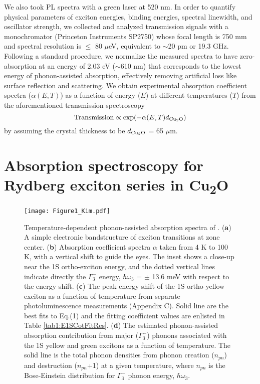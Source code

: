 \documentclass[aps,reprint,amsmath,amssymb,prb]{revtex4-1}
\begin{document}
We also took PL spectra with a green laser at 520 nm.  
In order to quantify physical parameters of exciton energies, binding energies, spectral linewidth, and oscillator strength, we collected and analyzed transmission signals with a monochromator (Princeton Instruments SP2750) whose focal length is 750 mm and spectral resolution is $\leq$ 80 $\mu$eV, equivalent to $\sim$20 pm or 19.3 GHz. 
Following a standard procedure, we normalize the measured spectra to have zero-absorption at an energy of 2.03 eV ($\sim$610 nm) that corresponds to the lowest energy of phonon-assisted absorption, effectively removing artificial loss like surface reflection and scattering. We obtain experimental absorption coefficient spectra ($\alpha (E, T)$) as a function of energy ($E$) at different temperatures ($T$) from the aforementioned transmission spectroscopy 
$$ \text{Transmission} \propto \exp(-\alpha (E,T) d_{\ce{Cu2O}})$$ 
by assuming the crystal thickness to be $d_{\ce{Cu2O}}$ = 65 $\mu$m. 

\section{Absorption spectroscopy for Rydberg exciton series in C\MakeLowercase{u}\textsubscript{2}O}

\begin{figure} 
\centering
\texttt{[image: Figure1\_Kim.pdf]}
\caption{Temperature-dependent phonon-assisted absorption spectra of . (\textbf{a}) A simple electronic bandstructure of  exciton transitions at zone center. (\textbf{b}) Absorption coefficient spectra $\alpha$ taken from 4 K to 100 K, with a vertical shift to guide the eyes. The inset shows a close-up near the 1S ortho-exciton energy, and the dotted vertical lines indicate directly the $\Gamma_3^-$ energy, $\hbar\omega_3$ = $\pm$ 13.6 meV with respect to the energy shift. (\textbf{c}) The peak energy shift of the 1S-ortho yellow exciton as a function of temperature from separate photoluminescence measurements (Appendix C). Solid line are the best fits to Eq.(1) and the fitting coefficient values are enlisted in Table \ref{tab1:E1SCotFitRes}. (\textbf{d}) The estimated phonon-assisted absorption contribution from major ($\Gamma_{3}^{-}$) phonons associated with the 1S yellow and green excitons as a function of temperature. The solid line is the total phonon densities from phonon creation ($n_{pn}$) and destruction ($n_{pn}$+1) at a given temperature, where $n_{pn}$ is the Bose-Einstein distribution for $\Gamma_{3}^{-}$ phonon energy, $\hbar \omega_3$. 
}
\label{Fig1:PhononAssistedAbsorption}
\end{figure}
\end{document}
